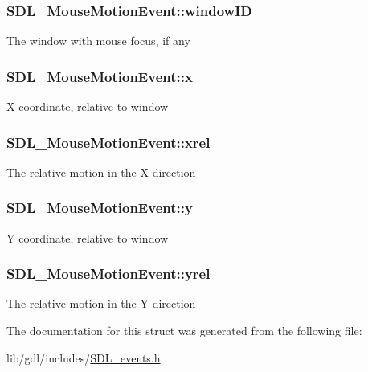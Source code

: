 \subsubsection[{window\+I\+D}]{ S\+D\+L\+\_\+\+Mouse\+Motion\+Event\+::window\+I\+D}\label{struct_s_d_l___mouse_motion_event_aa9976725242ada93a9e18e7fdf5796e6}
The window with mouse focus, if any \hypertarget{struct_s_d_l___mouse_motion_event_a36398bb4a5308446a262b0bfc8baa80a}{}
\subsubsection[{x}]{ S\+D\+L\+\_\+\+Mouse\+Motion\+Event\+::x}\label{struct_s_d_l___mouse_motion_event_a36398bb4a5308446a262b0bfc8baa80a}
X coordinate, relative to window \hypertarget{struct_s_d_l___mouse_motion_event_a1c01d9aba2a20778fb45a15dca39ef58}{}
\subsubsection[{xrel}]{ S\+D\+L\+\_\+\+Mouse\+Motion\+Event\+::xrel}\label{struct_s_d_l___mouse_motion_event_a1c01d9aba2a20778fb45a15dca39ef58}
The relative motion in the X direction \hypertarget{struct_s_d_l___mouse_motion_event_a7e6a7b1f8713d1968dc913908e8ea448}{}
\subsubsection[{y}]{ S\+D\+L\+\_\+\+Mouse\+Motion\+Event\+::y}\label{struct_s_d_l___mouse_motion_event_a7e6a7b1f8713d1968dc913908e8ea448}
Y coordinate, relative to window \hypertarget{struct_s_d_l___mouse_motion_event_a7674c8b92d039ab948f671a180fa7b30}{}
\subsubsection[{yrel}]{ S\+D\+L\+\_\+\+Mouse\+Motion\+Event\+::yrel}\label{struct_s_d_l___mouse_motion_event_a7674c8b92d039ab948f671a180fa7b30}
The relative motion in the Y direction 

The documentation for this struct was generated from the following file\+:\begin{DoxyCompactItemize}
\item 
lib/gdl/includes/\hyperlink{_s_d_l__events_8h}{S\+D\+L\+\_\+events.\+h}\end{DoxyCompactItemize}
